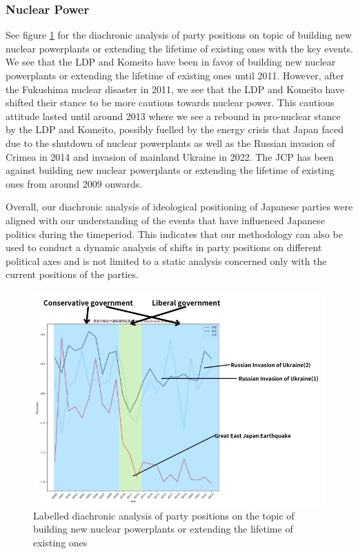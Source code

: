 \documentclass[final,5p,times,twocolumn,authoryear]{elsarticle}
\begin{document}
\subsubsection{Nuclear Power}
See figure \ref{fig:diachronic-nuclear} for the diachronic analysis of party positions on topic of building new nuclear powerplants or extending the lifetime of existing ones with the key events. We see that the LDP and Komeito have been in favor of building new nuclear powerplants or extending the lifetime of existing ones until 2011. However, after the Fukushima nuclear disaster in 2011, we see that the LDP and Komeito have shifted their stance to be more cautious towards nuclear power. This cautious attitude lasted until around 2013 where we see a rebound in pro-nuclear stance by the LDP and Komeito, possibly fuelled by the energy crisis that Japan faced due to the shutdown of nuclear powerplants as well as the Russian invasion of Crimea in 2014 and invasion of mainland Ukraine in 2022. The JCP has been against building new nuclear powerplants or extending the lifetime of existing ones from around 2009 onwards. 

Overall, our diachronic analysis of ideological positioning of Japanese parties were aligned with our understanding of the events that have influenced Japanese politics during the timeperiod. This indicates that our methodology can also be used to conduct a dynamic analysis of shifts in party positions on different political axes and is not limited to a static analysis concerned only with the current positions of the parties.

\begin{figure}
	\centering
	  \centering
	  \includegraphics[width=\linewidth]{figs/nuclear diachronic.png}
	  \caption{Labelled diachronic analysis of party positions on the topic of building new nuclear powerplants or extending the lifetime of existing ones}
	  \label{fig:diachronic-nuclear}
\end{figure}
\end{document}
